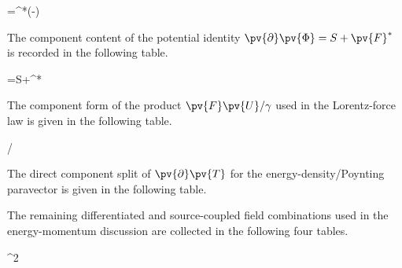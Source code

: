 \begin{componenttable}{\Box {}=\pv{\partial}^{*}(\rho-\cdot\sigv)}
\end{componenttable}

\noindent The component content of the potential identity \(\pv{\partial}\pv{\Phi}=S+\pv{F}^{*}\) is recorded in the following table.
\begin{componenttable}{\pv{\partial}\pv{\Phi}=S+^{*}}
\end{componenttable}

\noindent The component form of the product \(\pv{F} \pv{U}/\gamma\) used in the Lorentz-force law is given in the following table.
\begin{componenttable}{ /\gamma}
\end{componenttable}

\noindent The direct component split of \(\pv{\partial}\pv{T}\) for the energy-density/Poynting paravector is given in the following table.
\begin{componenttable}{\pv{\partial} }
\end{componenttable}

\noindent The remaining differentiated and source-coupled field combinations used in the energy-momentum discussion are collected in the following four tables.
\begin{componenttable}{\pv{\partial} ^{2}}
\end{componenttable}


